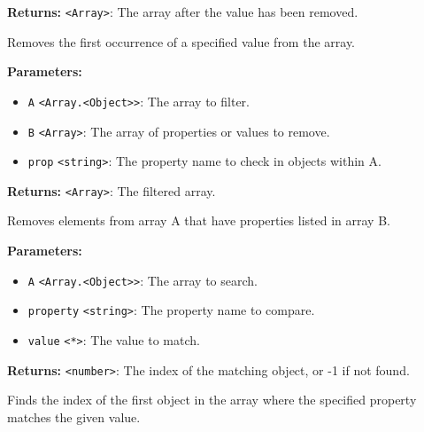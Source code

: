 \documentclass[12pt,a4paper]{article}
\begin{document}
\noindent \textbf{Returns:} \texttt{<Array>}: The array after the value has been removed.

\noindent Removes the first occurrence of a specified value from the array.

\vspace{5mm}
\noindent {}


\noindent \textbf{Parameters:}
\begin{itemize}
  \item \texttt{A} \texttt{<Array.<Object>>}: The array to filter.
  \item \texttt{B} \texttt{<Array>}: The array of properties or values to remove.
  \item \texttt{prop} \texttt{<string>}: The property name to check in objects within A.
\end{itemize}

\noindent \textbf{Returns:} \texttt{<Array>}: The filtered array.

\noindent Removes elements from array A that have properties listed in array B.

\vspace{5mm}
\noindent {}


\noindent \textbf{Parameters:}
\begin{itemize}
  \item \texttt{A} \texttt{<Array.<Object>>}: The array to search.
  \item \texttt{property} \texttt{<string>}: The property name to compare.
  \item \texttt{value} \texttt{<*>}: The value to match.
\end{itemize}

\noindent \textbf{Returns:} \texttt{<number>}: The index of the matching object, or -1 if not found.

\noindent Finds the index of the first object in the array where the specified property matches the given value.

\vspace{5mm}
\noindent {}
\end{document}
